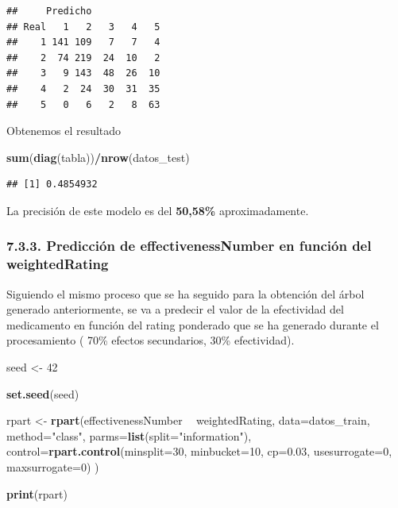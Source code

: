 \documentclass[spanish,]{article}
\newenvironment{Shaded}{\begin{snugshade}}{\end{snugshade}}
\newcommand{\KeywordTok}[1]{\textcolor[rgb]{0.13,0.29,0.53}{\textbf{#1}}}
\newcommand{\DataTypeTok}[1]{\textcolor[rgb]{0.13,0.29,0.53}{#1}}
\newcommand{\DecValTok}[1]{\textcolor[rgb]{0.00,0.00,0.81}{#1}}
\newcommand{\FloatTok}[1]{\textcolor[rgb]{0.00,0.00,0.81}{#1}}
\newcommand{\StringTok}[1]{\textcolor[rgb]{0.31,0.60,0.02}{#1}}
\newcommand{\OperatorTok}[1]{\textcolor[rgb]{0.81,0.36,0.00}{\textbf{#1}}}
\newcommand{\NormalTok}[1]{#1}
\begin{document}
\begin{verbatim}
##     Predicho
## Real   1   2   3   4   5
##    1 141 109   7   7   4
##    2  74 219  24  10   2
##    3   9 143  48  26  10
##    4   2  24  30  31  35
##    5   0   6   2   8  63
\end{verbatim}

Obtenemos el resultado

\begin{Shaded}
\begin{Highlighting}[]
\KeywordTok{sum}\NormalTok{(}\KeywordTok{diag}\NormalTok{(tabla))}\OperatorTok{/}\KeywordTok{nrow}\NormalTok{(datos_test)}
\end{Highlighting}
\end{Shaded}

\begin{verbatim}
## [1] 0.4854932
\end{verbatim}

La precisión de este modelo es del \textbf{50,58\%} aproximadamente.

\subsubsection{7.3.3. Predicción de effectivenessNumber en función del
weightedRating}\label{prediccion-de-effectivenessnumber-en-funcion-del-weightedrating}

Siguiendo el mismo proceso que se ha seguido para la obtención del árbol
generado anteriormente, se va a predecir el valor de la efectividad del
medicamento en función del rating ponderado que se ha generado durante
el procesamiento ( 70\% efectos secundarios, 30\% efectividad).

\begin{Shaded}
\begin{Highlighting}[]
\NormalTok{seed <-}\StringTok{ }\DecValTok{42}

\KeywordTok{set.seed}\NormalTok{(seed)}

\NormalTok{rpart <-}\StringTok{ }\KeywordTok{rpart}\NormalTok{(effectivenessNumber }\OperatorTok{~}\StringTok{ }\NormalTok{weightedRating, }\DataTypeTok{data=}\NormalTok{datos_train,}
                \DataTypeTok{method=}\StringTok{"class"}\NormalTok{,}
                \DataTypeTok{parms=}\KeywordTok{list}\NormalTok{(}\DataTypeTok{split=}\StringTok{"information"}\NormalTok{),}
                \DataTypeTok{control=}\KeywordTok{rpart.control}\NormalTok{(}\DataTypeTok{minsplit=}\DecValTok{30}\NormalTok{,}
                \DataTypeTok{minbucket=}\DecValTok{10}\NormalTok{,}
                \DataTypeTok{cp=}\FloatTok{0.03}\NormalTok{,}
                \DataTypeTok{usesurrogate=}\DecValTok{0}\NormalTok{,}
                \DataTypeTok{maxsurrogate=}\DecValTok{0}\NormalTok{)}
\NormalTok{              )}


\KeywordTok{print}\NormalTok{(rpart)}
\end{Highlighting}
\end{Shaded}
\end{document}
